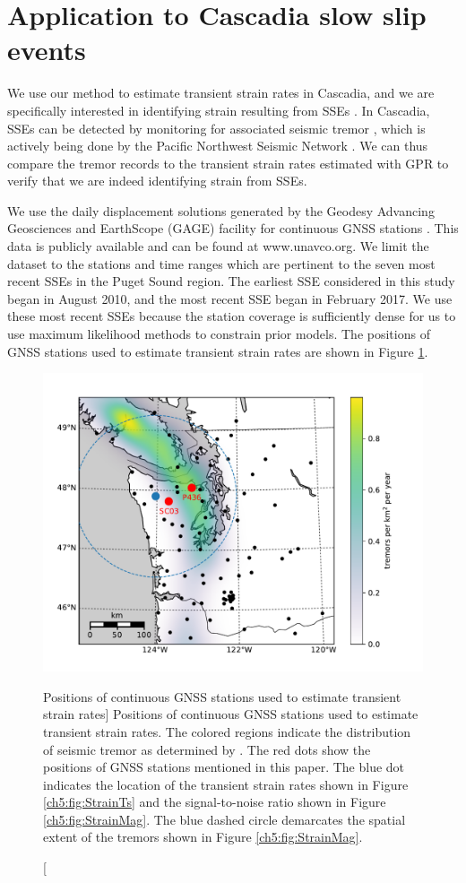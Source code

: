 \section{Application to Cascadia slow slip events}\label{ch5:sec:Cascadia}
We use our method to estimate transient strain rates in Cascadia, and
we are specifically interested in identifying strain resulting from
SSEs \citep[e.g.,][]{Dragert2001}. In Cascadia, SSEs can be detected
by monitoring for associated seismic tremor \citep{Rogers2003}, which
is actively being done by the Pacific Northwest Seismic Network
\citep{Wech2010}. We can thus compare the tremor records to the
transient strain rates estimated with GPR to verify that we are indeed
identifying strain from SSEs.

We use the daily displacement solutions generated by the Geodesy
Advancing Geosciences and EarthScope (GAGE) facility for continuous
GNSS stations \citep{Herring2016}. This data is publicly available and
can be found at www.unavco.org. We limit the dataset to the stations
and time ranges which are pertinent to the seven most recent SSEs in
the Puget Sound region. The earliest SSE considered in this study
began in August 2010, and the most recent SSE began in February 2017.
We use these most recent SSEs because the station coverage is
sufficiently dense for us to use maximum likelihood methods to
constrain prior models.  The positions of GNSS stations used to
estimate transient strain rates are shown in Figure
\ref{ch5:fig:Context}.

\begin{figure}
\includegraphics{ch5/figures/context_map/context-map.pdf}
\caption
[Positions of continuous GNSS stations used to estimate transient
strain rates]
{Positions of continuous GNSS stations used to estimate
transient strain rates. The colored regions indicate the distribution
of seismic tremor as determined by \citet{Wech2010}. The red dots show
the positions of GNSS stations mentioned in this paper. The blue dot
indicates the location of the transient strain rates shown in Figure
\ref{ch5:fig:StrainTs} and the signal-to-noise ratio shown in Figure
\ref{ch5:fig:StrainMag}. The blue dashed circle demarcates the spatial
extent of the tremors shown in Figure \ref{ch5:fig:StrainMag}.}
\label{ch5:fig:Context}
\end{figure}

